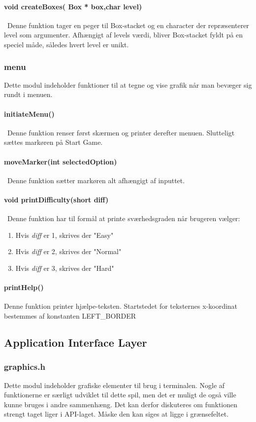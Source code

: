 \paragraph{
void createBoxes( Box * box,char level)}\
Denne funktion tager en peger til Box-stacket og en character der repræsenterer level som argumenter.  Afhængigt af levels værdi, bliver Box-stacket fyldt på en speciel måde, således hvert level er unikt. 

\subsubsection{menu}
Dette modul indeholder funktioner til at tegne og vise grafik når man bevæger sig rundt i menuen.
\paragraph{initiateMenu()}\
Denne funktion renser først skærmen og printer derefter menuen. Slutteligt sættes markøren på Start Game.
\paragraph{moveMarker(int selectedOption)}\
Denne funktion sætter markøren alt afhængigt af inputtet.
\paragraph{void printDifficulty(short diff)}\
Denne funktion har til formål at printe sværhedsgraden når brugeren vælger:
\begin{enumerate}
\item Hvis \textit{diff} er 1, skrives der "Easy"
\item Hvis \textit{diff} er 2, skrives der "Normal"
\item Hvis \textit{diff} er 3, skrives der "Hard"
\end{enumerate}
\paragraph{printHelp()}
Denne funktion printer hjælpe-teksten. Startstedet for teksternes x-koordinat bestemmes af konstanten LEFT\_BORDER

\subsection{Application Interface Layer}
\subsubsection{graphics.h}
Dette modul indeholder grafiske elementer til brug i terminalen. Nogle af funktionerne er særligt udviklet til dette spil, men det er muligt de også ville kunne bruges i andre sammenhæng.  Det kan derfor diskuteres om funktionen strengt taget liger i API-laget. Måske den kan siges at ligge i grænsefeltet.
